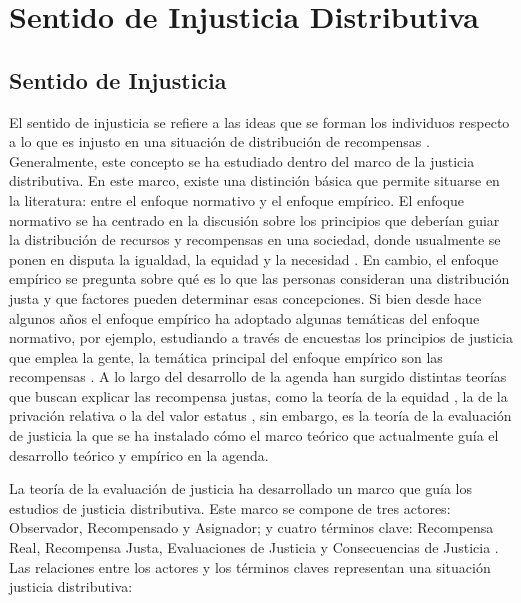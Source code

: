 \documentclass[12pt,twoside]{templates/facsothesis}
\begin{document}
\hypertarget{sentido-de-injusticia-distributiva}{%
\section{Sentido de Injusticia Distributiva}\label{sentido-de-injusticia-distributiva}}

\hypertarget{sentido-de-injusticia}{%
\subsection{Sentido de Injusticia}\label{sentido-de-injusticia}}

El sentido de injusticia se refiere a las ideas que se forman los individuos respecto a lo que es injusto en una situación de distribución de recompensas \citep{Jasso2015}. Generalmente, este concepto se ha estudiado dentro del marco de la justicia distributiva. En este marco, existe una distinción básica que permite situarse en la literatura: entre el enfoque normativo y el enfoque empírico. El enfoque normativo se ha centrado en la discusión sobre los principios que deberían guiar la distribución de recursos y recompensas en una sociedad, donde usualmente se ponen en disputa la igualdad, la equidad y la necesidad \citep{Wegener1992}. En cambio, el enfoque empírico se pregunta sobre qué es lo que las personas consideran una distribución justa y que factores pueden determinar esas concepciones. Si bien desde hace algunos años el enfoque empírico ha adoptado algunas temáticas del enfoque normativo, por ejemplo, estudiando a través de encuestas los principios de justicia que emplea la gente, la temática principal del enfoque empírico son las recompensas \citep{Sabbagh2001}. A lo largo del desarrollo de la agenda han surgido distintas teorías que buscan explicar las recompensa justas, como la teoría de la equidad \citep{Adams1963, Homans1961}, la de la privación relativa \citep{Runciman1966} o la del valor estatus \citep{Berger1989}, sin embargo, es la teoría de la evaluación de justicia \citep{Jasso1980} la que se ha instalado cómo el marco teórico que actualmente guía el desarrollo teórico y empírico en la agenda.

La teoría de la evaluación de justicia ha desarrollado un marco que guía los estudios de justicia distributiva. Este marco se compone de tres actores: Observador, Recompensado y Asignador; y cuatro términos clave: Recompensa Real, Recompensa Justa, Evaluaciones de Justicia y Consecuencias de Justicia \citep{Jasso2016}. Las relaciones entre los actores y los términos claves representan una situación justicia distributiva:
\end{document}
